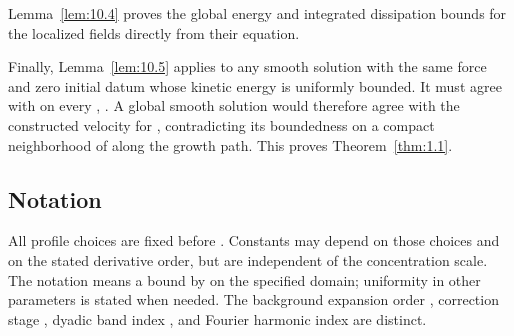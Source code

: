 %
Lemma~\ref{lem:10.4} proves the global energy and integrated dissipation bounds for the localized
fields directly from their equation.

Finally, Lemma~\ref{lem:10.5} applies to any smooth solution with the same force and zero initial
datum whose kinetic energy is uniformly bounded. It must agree with
 on every ,
. A global smooth solution would therefore agree with the constructed velocity for
, contradicting its boundedness on a compact neighborhood of
 along the growth path. This proves Theorem~\ref{thm:1.1}.

\subsection{Notation}\label{sec:3.6}
All profile choices are fixed before . Constants may depend on those
choices and on the stated derivative order, but are independent of the concentration scale.
The notation  means a bound by
 on the specified domain; uniformity in other
parameters is stated when needed. The background expansion order
, correction stage ,
dyadic band index , and Fourier harmonic index are distinct.

